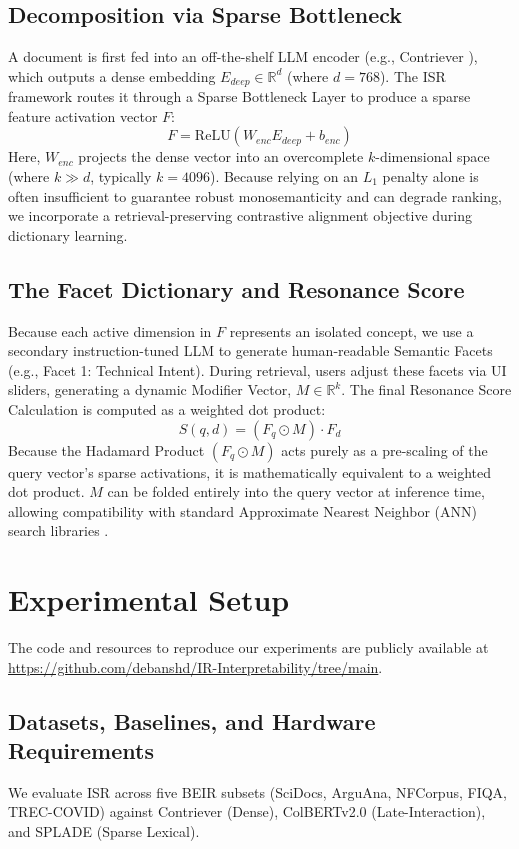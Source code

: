 \documentclass[sigconf,authordraft]{acmart}
\begin{document}
\subsection{Decomposition via Sparse Bottleneck}
A document is first fed into an off-the-shelf LLM encoder (e.g., Contriever \cite{izacard2022}), which outputs a dense embedding $E_{deep} \in \mathbb{R}^d$ (where $d=768$). The ISR framework routes it through a Sparse Bottleneck Layer to produce a sparse feature activation vector $F$:
\begin{equation}
F = \text{ReLU}(W_{enc}E_{deep} + b_{enc})
\end{equation}
Here, $W_{enc}$ projects the dense vector into an overcomplete $k$-dimensional space (where $k \gg d$, typically $k=4096$). Because relying on an $L_1$ penalty alone is often insufficient to guarantee robust monosemanticity and can degrade ranking, we incorporate a retrieval-preserving contrastive alignment objective during dictionary learning.

\subsection{The Facet Dictionary and Resonance Score}
Because each active dimension in $F$ represents an isolated concept, we use a secondary instruction-tuned LLM to generate human-readable Semantic Facets (e.g., Facet 1: Technical Intent). During retrieval, users adjust these facets via UI sliders, generating a dynamic Modifier Vector, $M \in \mathbb{R}^k$. The final Resonance Score Calculation is computed as a weighted dot product:
\begin{equation}
S(q,d) = (F_q \odot M) \cdot F_d
\end{equation}
Because the Hadamard Product $(F_q \odot M)$ acts purely as a pre-scaling of the query vector's sparse activations, it is mathematically equivalent to a weighted dot product. $M$ can be folded entirely into the query vector at inference time, allowing compatibility with standard Approximate Nearest Neighbor (ANN) search libraries \cite{johnson2019}.

\section{Experimental Setup}
The code and resources to reproduce our experiments are publicly available at \url{https://github.com/debanshd/IR-Interpretability/tree/main}.

\subsection{Datasets, Baselines, and Hardware Requirements}
We evaluate ISR across five BEIR subsets \cite{thakur2021} (SciDocs, ArguAna, NFCorpus, FIQA, TREC-COVID) against Contriever (Dense), ColBERTv2.0 \cite{khattab2020} (Late-Interaction), and SPLADE \cite{formal2021} (Sparse Lexical).
\end{document}
